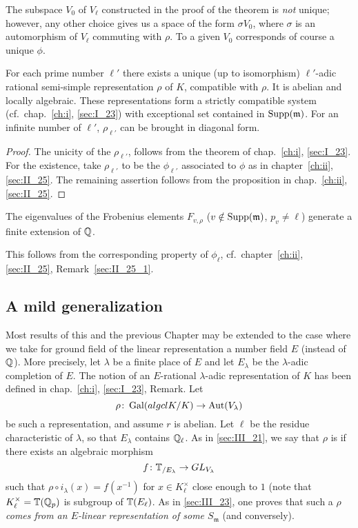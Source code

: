 \begin{obs}
	The subspace $V_0$ of $V_\ell$ constructed in the proof of the theorem
	is \emph{not} unique; however, any other choice gives us a space of the
	form $\sigma V_0$, where $\sigma$ is an automorphism of $V_\ell$
	commuting with $\rho$. To a given $V_0$ corresponds of course a unique
	$\phi$.
\end{obs}

\begin{cor}
	For each prime number $\ell'$ there exists a unique (up to isomorphism)
	$\ell'$-adic rational semi-simple representation $\rho$ of $K$,
	compatible with $\rho$. It is abelian and locally algebraic.  These
	representations form a strictly compatible system (cf.\
	chap.~\ref{ch:i}, \ref{sec:I_23}) with exceptional set contained in
	$\operatorname{Supp}(\mathfrak{m})$. For an infinite number of $\ell'$,
	$\rho_{\ell'}$ can be brought in diagonal form.
\end{cor}
\begin{proof}
	The unicity of the $\rho_{\ell'}$, follows from the theorem of
	chap.~\ref{ch:i}, \ref{sec:I_23}. For the existence, take
	$\rho_{\ell'}$ to be the $\phi_{\ell'}$ associated to $\phi$ as
	in chapter~\ref{ch:ii}, \ref{sec:II_25}. The remaining assertion
	follows from the proposition in chap.~\ref{ch:ii}, \ref{sec:II_25}.
\end{proof}

\begin{cor}
	The eigenvalues of the Frobenius elements $F_{v, \rho}$ ($v \notin
	\operatorname{Supp}(\mathfrak{m})$, $p_v \ne \ell$) generate a finite extension of
	$\mathbb{Q}$.
\end{cor}
This follows from the corresponding property of $\phi_\ell$, cf.\
chapter~\ref{ch:ii}, \ref{sec:II_25}, Remark~\ref{sec:II_25_1}.

\dpage
\subsection{A mild generalization}
\label{sec:III_24}

Most results of this and the previous Chapter may be extended to the case where
we take for ground field of the linear representation a number field $E$
(instead of $\mathbb{Q}$). More precisely, let $\lambda$ be a finite place of $E$ and
let $E_\lambda$ be the $\lambda$-adic completion of $E$. The notion of an
$E$-rational $\lambda$-adic representation of $K$ has been defined in
chap.~\ref{ch:i}, \ref{sec:I_23}, Remark.
\todo[pinktask]{referenciar el remark?}
Let
\[
	\rho \colon \operatorname{Gal}(algcl{K}/K) \to \operatorname{Aut}(V_\lambda)
\]
be such a representation, and assume $r$ is abelian. Let $\ell$ be the residue
characteristic of $\lambda$, so that $E_\lambda$ contains $\mathbb{Q}_\ell$. As in
\ref{sec:III_21}, we say that $\rho$ is \strong{locally algebraic} if there
exists an algebraic morphism
\[
	f \colon \mathbb{T}_{/E_\lambda} \to GL_{V_\lambda}
\]
such that $\rho \circ i_\lambda(x) = f(x^{-1})$ for $x \in K^\times_\ell$ close
enough to $1$ (note that $K^\times_\ell = \mathbb{T}(\mathbb{Q}_p)$ is subgroup of
$\mathbb{T}(E_\ell)$. As in \ref{sec:III_23}, one proves that such a $\rho$ \emph{comes
from an $E$-linear representation of some $S_\mathfrak{m}$} (and conversely).  

